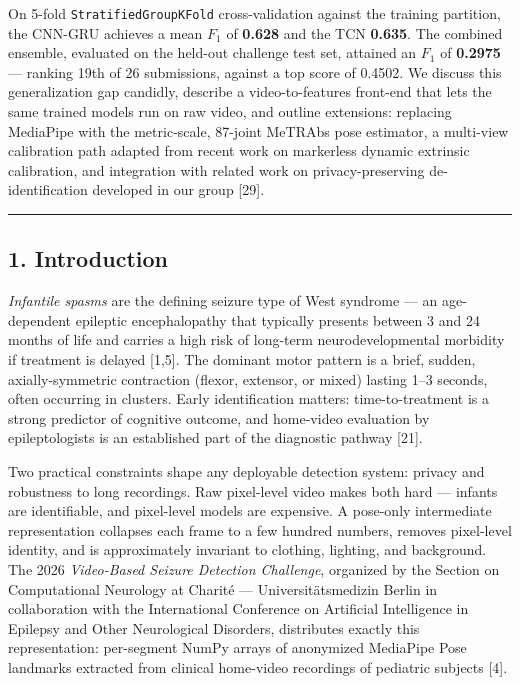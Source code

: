 \documentclass[
  11pt,
]{article}
\begin{document}
On 5-fold \texttt{StratifiedGroupKFold} cross-validation against the
training partition, the CNN-GRU achieves a mean \(F_1\) of
\textbf{0.628} and the TCN \textbf{0.635}. The combined ensemble,
evaluated on the held-out challenge test set, attained an \(F_1\) of
\textbf{0.2975} --- ranking 19th of 26 submissions, against a top score
of 0.4502. We discuss this generalization gap candidly, describe a
video-to-features front-end that lets the same trained models run on raw
video, and outline extensions: replacing MediaPipe with the
metric-scale, 87-joint MeTRAbs pose estimator, a multi-view calibration
path adapted from recent work on markerless dynamic extrinsic
calibration, and integration with related work on privacy-preserving
de-identification developed in our group {[}29{]}.

\begin{center}\rule{0.5\linewidth}{0.5pt}\end{center}

\subsection{1. Introduction}\label{introduction}

\emph{Infantile spasms} are the defining seizure type of West syndrome
--- an age-dependent epileptic encephalopathy that typically presents
between 3 and 24 months of life and carries a high risk of long-term
neurodevelopmental morbidity if treatment is delayed {[}1,5{]}. The
dominant motor pattern is a brief, sudden, axially-symmetric contraction
(flexor, extensor, or mixed) lasting 1--3 seconds, often occurring in
clusters. Early identification matters: time-to-treatment is a strong
predictor of cognitive outcome, and home-video evaluation by
epileptologists is an established part of the diagnostic pathway
{[}21{]}.

Two practical constraints shape any deployable detection system: privacy
and robustness to long recordings. Raw pixel-level video makes both hard
--- infants are identifiable, and pixel-level models are expensive. A
pose-only intermediate representation collapses each frame to a few
hundred numbers, removes pixel-level identity, and is approximately
invariant to clothing, lighting, and background. The 2026
\emph{Video-Based Seizure Detection Challenge}, organized by the Section
on Computational Neurology at Charité --- Universitätsmedizin Berlin in
collaboration with the International Conference on Artificial
Intelligence in Epilepsy and Other Neurological Disorders, distributes
exactly this representation: per-segment NumPy arrays of anonymized
MediaPipe Pose landmarks extracted from clinical home-video recordings
of pediatric subjects {[}4{]}.
\end{document}
